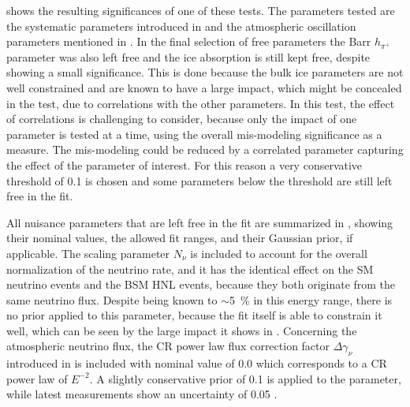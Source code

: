  shows the resulting significances of one of these tests. The parameters tested are the systematic parameters introduced in  and the atmospheric oscillation parameters mentioned in . In the final selection of free parameters the Barr $h_{\pi^+}$ parameter was also left free and the ice absorption is still kept free, despite showing a small significance. This is done because the bulk ice parameters are not well constrained and are known to have a large impact, which might be concealed in the test, due to correlations with the other parameters. In this test, the effect of correlations is challenging to consider, because only the impact of one parameter is tested at a time, using the overall mis-modeling significance as a measure. The mis-modeling could be reduced by a correlated parameter capturing the effect of the parameter of interest. For this reason a very conservative threshold of \SI{0.1}{\sigma} is chosen and some parameters below the threshold are still left free in the fit.

All nuisance parameters that are left free in the fit are summarized in , showing their nominal values, the allowed fit ranges, and their Gaussian prior, if applicable. The scaling parameter $N_{\nu}$ is included to account for the overall normalization of the neutrino rate, and it has the identical effect on the SM neutrino events and the BSM HNL events, because they both originate from the same neutrino flux. Despite being known to $\sim$\SI{5}{\percent} in this energy range, there is no prior applied to this parameter, because the fit itself is able to constrain it well, which can be seen by the large impact it shows in . Concerning the atmospheric neutrino flux, the CR power law flux correction factor $\Delta \gamma_\nu$ introduced in  is included with nominal value of 0.0 which corresponds to a CR power law of $E^{-2}$. A slightly conservative prior of 0.1 is applied to the parameter, while latest measurements show an uncertainty of 0.05 .


